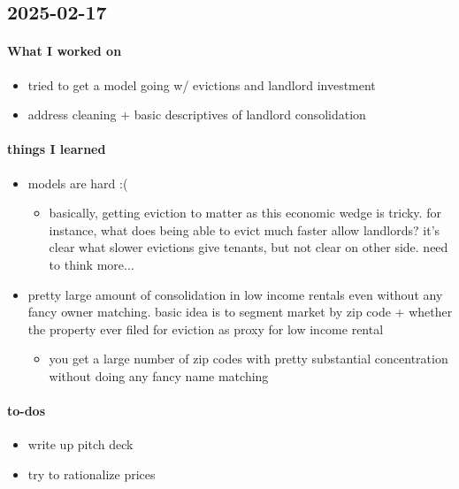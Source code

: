 \subsection{2025-02-17}

\paragraph{What I worked on}
\begin{itemize}
    \item tried to get a model going w/ evictions and landlord investment
    \item address cleaning + basic descriptives of landlord consolidation
\end{itemize}

\paragraph{things I learned}
\begin{itemize}
    \item models are hard :(
    \begin{itemize}
        \item basically, getting eviction to matter as this economic wedge is tricky. for instance, what does being able to evict much faster allow landlords? it's clear what slower evictions give tenants, but not clear on other side. need to think more...
    \end{itemize}
    \item pretty large amount of consolidation in low income rentals even without any fancy owner matching. basic idea is to segment market by zip code + whether the property ever filed for eviction as proxy for low income rental
    \begin{itemize}
        \item you get a large number of zip codes with pretty substantial concentration without doing any fancy name matching
    \end{itemize}
\end{itemize}

\paragraph{to-dos}
\begin{itemize}
    \item write up pitch deck
    \item try to rationalize prices
\end{itemize}